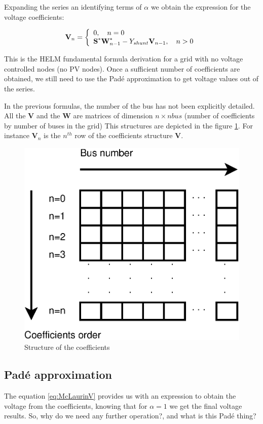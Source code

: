 \documentclass[a4paper,twoside,fleqn]{tufte-book}
\begin{document}
Expanding the series an identifying terms of $\alpha$ we obtain the expression for the voltage coefficients:

\begin{equation}
\textbf{V}_n =
\left\{
\begin{array}{ll}
\mathlarger{0}, \quad n=0\\
\mathlarger{\textbf{S}^* \textbf{W}^*_{n-1} - Y_{shunt} \textbf{V}_{n-1} }, \quad n>0
\end{array}
\right.
\end{equation}

This is the HELM fundamental formula derivation for a grid with no voltage controlled nodes (no PV nodes). Once a sufficient number of coefficients are obtained, we still need to use the Pad\'e approximation to get voltage values out of the series.


In the previous formulas, the number of the bus has not been explicitly detailed. All the $\textbf{V}$ and the $\textbf{W}$ are matrices of dimension $n \times nbus$ (number of coefficients by number of buses in the grid) This structures are depicted in the figure \ref{fig:CoefficientsStructure}. For instance $\textbf{V}_n$ is the $n^{th}$ row of the coefficients structure $\textbf{V}$.


\begin{figure}[h]
	\centering
	\includegraphics[width=0.4\linewidth]{img/CoefficientsStructure.eps}
	\caption{Structure of the coefficients}
	\label{fig:CoefficientsStructure}
\end{figure}

\subsection{Pad\'e approximation}

The equation \ref{eq:McLaurinV} provides us with an expression to obtain the voltage from the coefficients, knowing that for $\alpha=1$ we get the final voltage results. So, why do we need any further operation?, and what is this Pad\'e thing?
\end{document}
